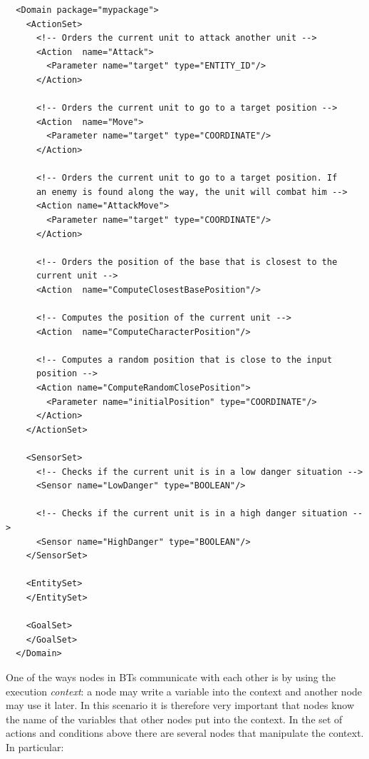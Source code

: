 \documentclass[a4paper]{article}
\begin{document}
\begin{verbatim}
  <Domain package="mypackage">
    <ActionSet>
      <!-- Orders the current unit to attack another unit -->
      <Action  name="Attack">
        <Parameter name="target" type="ENTITY_ID"/>
      </Action>

      <!-- Orders the current unit to go to a target position -->
      <Action  name="Move">
        <Parameter name="target" type="COORDINATE"/>
      </Action>

      <!-- Orders the current unit to go to a target position. If
      an enemy is found along the way, the unit will combat him -->
      <Action name="AttackMove">
        <Parameter name="target" type="COORDINATE"/>
      </Action>

      <!-- Orders the position of the base that is closest to the
      current unit -->
      <Action  name="ComputeClosestBasePosition"/>

      <!-- Computes the position of the current unit -->
      <Action  name="ComputeCharacterPosition"/>
      
      <!-- Computes a random position that is close to the input
      position -->
      <Action name="ComputeRandomClosePosition">
        <Parameter name="initialPosition" type="COORDINATE"/>
      </Action>
    </ActionSet>
    
    <SensorSet>
      <!-- Checks if the current unit is in a low danger situation -->
      <Sensor name="LowDanger" type="BOOLEAN"/>

      <!-- Checks if the current unit is in a high danger situation -->
      <Sensor name="HighDanger" type="BOOLEAN"/>
    </SensorSet>

    <EntitySet>
    </EntitySet>

    <GoalSet>
    </GoalSet>
  </Domain>
\end{verbatim}

One of the ways nodes in BTs communicate with each other is by using the execution \textit{context}: a node may write a variable into the context and another node may use it later. In this scenario it is therefore very important that nodes know the name of the variables that other nodes put into the context. In the set of actions and conditions above there are several nodes that manipulate the context. In particular:
\end{document}
